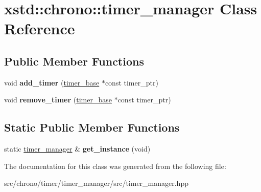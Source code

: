 \hypertarget{classxstd_1_1chrono_1_1timer__manager}{\section{xstd\-:\-:chrono\-:\-:timer\-\_\-manager Class Reference}
\label{classxstd_1_1chrono_1_1timer__manager}
}
\subsection*{Public Member Functions}
\begin{DoxyCompactItemize}
\item 
\hypertarget{classxstd_1_1chrono_1_1timer__manager_ae97c0dba8154bace5af93caae4948c8c}{void {\bfseries add\-\_\-timer} (\hyperlink{classxstd_1_1chrono_1_1timer__base}{timer\-\_\-base} $\ast$const timer\-\_\-ptr)}\label{classxstd_1_1chrono_1_1timer__manager_ae97c0dba8154bace5af93caae4948c8c}

\item 
\hypertarget{classxstd_1_1chrono_1_1timer__manager_af368bd572a757f8f78e39e4572114a84}{void {\bfseries remove\-\_\-timer} (\hyperlink{classxstd_1_1chrono_1_1timer__base}{timer\-\_\-base} $\ast$const timer\-\_\-ptr)}\label{classxstd_1_1chrono_1_1timer__manager_af368bd572a757f8f78e39e4572114a84}

\end{DoxyCompactItemize}
\subsection*{Static Public Member Functions}
\begin{DoxyCompactItemize}
\item 
\hypertarget{classxstd_1_1chrono_1_1timer__manager_a8894928f093db753153f2f87dfa511e0}{static \hyperlink{classxstd_1_1chrono_1_1timer__manager}{timer\-\_\-manager} \& {\bfseries get\-\_\-instance} (void)}\label{classxstd_1_1chrono_1_1timer__manager_a8894928f093db753153f2f87dfa511e0}

\end{DoxyCompactItemize}


The documentation for this class was generated from the following file\-:\begin{DoxyCompactItemize}
\item 
src/chrono/timer/timer\-\_\-manager/src/timer\-\_\-manager.\-hpp\end{DoxyCompactItemize}
